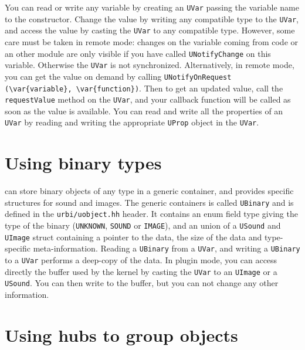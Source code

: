 You can read or write any \urbi variable by creating an
\lstinline{UVar} passing the variable name to the constructor. Change
the value by writing any compatible type to the \lstinline{UVar}, and
access the value by casting the \lstinline{UVar} to any compatible
type. However, some care must be taken in remote mode: changes on the
variable coming from \urbi code or an other module are only visible if
you have called \lstinline{UNotifyChange} on this variable. Otherwise
the \lstinline{UVar} is not synchronized. Alternatively, in remote
mode, you can get the value on demand by calling
\lstinline|UNotifyOnRequest (\var{variable}, \var{function})|. Then to get an
updated value, call the \lstinline{requestValue} method on the
\lstinline{UVar}, and your callback function will be called as soon as
the value is available. You can read and write all the \urbi
properties of an \lstinline{UVar} by reading and writing the
appropriate \lstinline{UProp} object in the \lstinline{UVar}.

\section{Using binary types}

\urbi can store binary objects of any type in a generic container, and
provides specific structures for sound and images. The generic
containers is called \lstinline{UBinary} and is defined in the
\lstinline{urbi/uobject.hh} header. It contains an enum field type
giving the type of the binary (\lstinline{UNKNOWN}, \lstinline{SOUND}
or \lstinline{IMAGE}), and an union of a \lstinline{USound} and
\lstinline{UImage} struct containing a pointer to the data, the size
of the data and type-specific meta-information. Reading a
\lstinline{UBinary} from a \lstinline{UVar}, and writing a
\lstinline{UBinary} to a \lstinline{UVar} performs a deep-copy of the
data. In plugin mode, you can access directly the buffer used by the
kernel by casting the \lstinline{UVar} to an \lstinline{UImage} or a
\lstinline{USound}. You can then write to the buffer, but you can not
change any other information.

\section{Using hubs to group objects}

